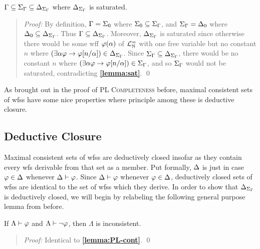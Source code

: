 \begin{Lthm} \label{lemma:include}
  $\Gamma\subseteq\Sigma_{\Gamma}\subseteq\Delta_{\Sigma_{\Gamma}}$ where $\Delta_{\Sigma_{\Gamma}}$ is saturated.
\end{Lthm}
 
\begin{quote} 
  \textit{Proof:} 
  By definition, $\Gamma=\Sigma_0$ where $\Sigma_0\subseteq\Sigma_{\Gamma}$, and $\Sigma_{\Gamma}=\Delta_0$ where $\Delta_0\subseteq\Delta_{\Sigma_{\Gamma}}$.
  Thus $\Gamma\subseteq\Delta_{\Sigma_{\Gamma}}$.
  Moreover, $\Delta_{\Sigma_{\Gamma}}$ is saturated since otherwise there would be some wff $\varphi(\alpha)$ of $\mathcal{L}^{=}_{\mathbb{N}}$ with one free variable but no constant $n$ where $(\exists \alpha\varphi \rightarrow \varphi[n/\alpha])\in\Delta_{\Sigma_{\Gamma}}$. 
  Since $\Sigma_{\Gamma}\subseteq\Delta_{\Sigma_{\Gamma}}$, there would be no constant $n$ where $(\exists \alpha\varphi \rightarrow \varphi[n/\alpha])\in\Sigma_{\Gamma}$, and so $\Sigma_{\Gamma}$ would not be saturated, contradicting \textbf{\ref{lemma:sat}}.
  \qed
\end{quote}

As brought out in the proof of \textsc{PL Completeness} before, maximal consistent sets of wfss have some nice properties where principle among these is deductive closure.



\subsection{Deductive Closure}%
  \label{sub:DeductiveClosure}

Maximal consistent sets of wfss are deductively closed insofar as they contain every wfs derivable from that set as a member.
Put formally, $\Delta$ is  just in case $\varphi\in\Delta$ whenever $\Delta\vdash\varphi$.
Since $\Delta\vdash\varphi$ whenever $\varphi\in\Delta$, deductively closed sets of wfss are identical to the set of wfss which they derive.
In order to show that $\Delta_{\Sigma_{\Gamma}}$ is deductively closed, we will begin by relabeling the following general purpose lemma from before. 

\begin{Lthm} \label{lemma:cont}
  If $\Lambda\vdash\varphi$ and $\Lambda\vdash\neg\varphi$, then $\Lambda$ is inconsistent. 
\end{Lthm}

\begin{quote} 
  \textit{Proof:} 
  Identical to \textbf{\ref{lemma:PL-cont}}.
  \qed
\end{quote}
  




